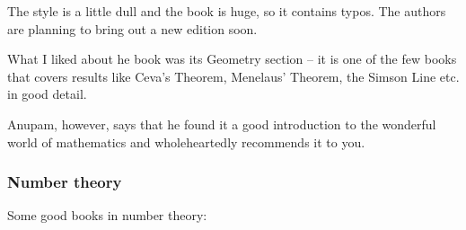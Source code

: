 \documentclass[a4paper]{amsart}
\begin{document}
\begin{enumerate}
  The style is a little dull and the book is huge, so it contains typos. The authors are planning to bring out a new
  edition soon.

  What I liked about he book was its Geometry section -- it is one of the few books that covers results like Ceva's Theorem,
  Menelaus' Theorem, the Simson Line etc. in good detail.

  Anupam, however, says that he found it a good introduction to the wonderful world of mathematics and wholeheartedly recommends it to
  you.
\end{enumerate}

\subsubsection{Number theory}

Some good books in number theory:
\end{document}
